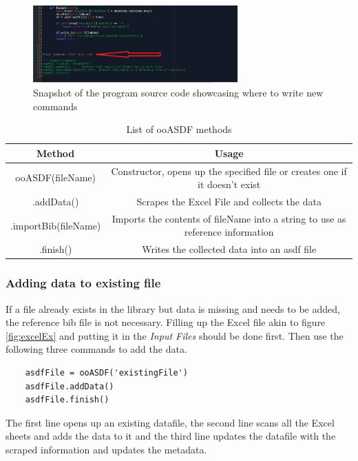 \begin{figure}[h]
    \centering
    \includegraphics[width = 0.7\textwidth]{msdf/figures/ooASDFwhereToType.PNG}
    \caption{Snapshot of the program source code showcasing where to write new commands}
    \label{fig:ooASDFtypeLocation}
\end{figure}

\begin{table}[h]
    \centering
    \caption{List of ooASDF methods}
    \begin{adjustbox}{width=1\textwidth}
    \begin{tabular}{c|c}
    \hline
    Method    & Usage  \\ \hline
    ooASDF(fileName) & Constructor, opens up the specified file or creates one if it doesn't exist \\
    .addData() & Scrapes the Excel File and collects the data \\
    .importBib(fileName) & Imports the contents of fileName into a string to use as reference information \\
    .finish() & Writes the collected data into an asdf file\\
    \hline
    \end{tabular}
    \end{adjustbox}
    \label{tab:ooASDFmethods}
\end{table}


\subsubsection{Adding data to existing file}
If a file already exists in the library but data is missing and needs to be added, the reference bib file is not necessary. Filling up the Excel file akin to figure \ref{fig:excelEx} and putting it in the \textit{Input Files} should be done first. Then use the following three commands to add the data.
\begin{verbatim}
    asdfFile = ooASDF('existingFile')
    asdfFile.addData()
    asdfFile.finish()
\end{verbatim}
The first line opens up an existing datafile, the second line scans all the Excel sheets and adds the data to it and the third line updates the datafile with the scraped information and updates the metadata.

